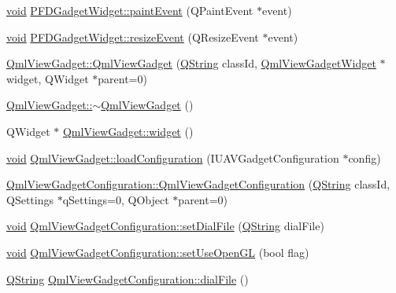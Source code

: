 \begin{DoxyCompactItemize}
\item 
\hyperlink{group___u_a_v_objects_plugin_ga444cf2ff3f0ecbe028adce838d373f5c}{void} \hyperlink{group___o_p_map_plugin_gaf2685b40cf25a74f35cc9829ca64c774}{\-P\-F\-D\-Gadget\-Widget\-::paint\-Event} (\-Q\-Paint\-Event $\ast$event)
\item 
\hyperlink{group___u_a_v_objects_plugin_ga444cf2ff3f0ecbe028adce838d373f5c}{void} \hyperlink{group___o_p_map_plugin_gabdb991171226a4eea59b92bc2daf7bc9}{\-P\-F\-D\-Gadget\-Widget\-::resize\-Event} (\-Q\-Resize\-Event $\ast$event)
\item 
\hyperlink{group___o_p_map_plugin_ga20a7caf16d8ece4d83abc6c96c5a6556}{\-Qml\-View\-Gadget\-::\-Qml\-View\-Gadget} (\hyperlink{group___u_a_v_objects_plugin_gab9d252f49c333c94a72f97ce3105a32d}{\-Q\-String} class\-Id, \hyperlink{class_qml_view_gadget_widget}{\-Qml\-View\-Gadget\-Widget} $\ast$widget, \-Q\-Widget $\ast$parent=0)
\item 
\hyperlink{group___o_p_map_plugin_gacae7d443d2a8754279dd055180fc2622}{\-Qml\-View\-Gadget\-::$\sim$\-Qml\-View\-Gadget} ()
\item 
\-Q\-Widget $\ast$ \hyperlink{group___o_p_map_plugin_ga7687b494af7a9e5b6f9550ff75f4a98c}{\-Qml\-View\-Gadget\-::widget} ()
\item 
\hyperlink{group___u_a_v_objects_plugin_ga444cf2ff3f0ecbe028adce838d373f5c}{void} \hyperlink{group___o_p_map_plugin_ga38c57a339a1bd7d6c6295d9f4fdcd016}{\-Qml\-View\-Gadget\-::load\-Configuration} (\-I\-U\-A\-V\-Gadget\-Configuration $\ast$config)
\item 
\hyperlink{group___o_p_map_plugin_gac44e73d868f1af30be54bb966ffc1998}{\-Qml\-View\-Gadget\-Configuration\-::\-Qml\-View\-Gadget\-Configuration} (\hyperlink{group___u_a_v_objects_plugin_gab9d252f49c333c94a72f97ce3105a32d}{\-Q\-String} class\-Id, \-Q\-Settings $\ast$q\-Settings=0, \-Q\-Object $\ast$parent=0)
\item 
\hyperlink{group___u_a_v_objects_plugin_ga444cf2ff3f0ecbe028adce838d373f5c}{void} \hyperlink{group___o_p_map_plugin_ga3811e60e4028c59e57997daf43edc66a}{\-Qml\-View\-Gadget\-Configuration\-::set\-Dial\-File} (\hyperlink{group___u_a_v_objects_plugin_gab9d252f49c333c94a72f97ce3105a32d}{\-Q\-String} dial\-File)
\item 
\hyperlink{group___u_a_v_objects_plugin_ga444cf2ff3f0ecbe028adce838d373f5c}{void} \hyperlink{group___o_p_map_plugin_ga9613450d5753ab06673c80b0d137cbe8}{\-Qml\-View\-Gadget\-Configuration\-::set\-Use\-Open\-G\-L} (bool flag)
\item 
\hyperlink{group___u_a_v_objects_plugin_gab9d252f49c333c94a72f97ce3105a32d}{\-Q\-String} \hyperlink{group___o_p_map_plugin_ga797d73a96488915da65e8cd79ceac1fe}{\-Qml\-View\-Gadget\-Configuration\-::dial\-File} ()

\end{DoxyCompactItemize}
